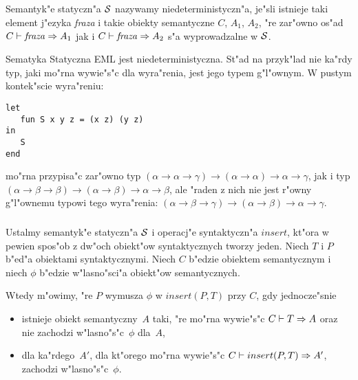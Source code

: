 \subsection{\secinterest}
\label{sec:interest}

\subsubsection{\secindeterm}
\label{sec:indeterm}

Semantyk"e statyczn"a $\mbox{$\cal S$}$ nazywamy niedeterministyczn"a, 
je"sli istnieje taki element j"ezyka {\it fraza} i takie obiekty semantyczne $C$, $A_1$, $A_2$,
"re zar"owno os"ad $C\vdash{\it fraza}\Rightarrow A_1$ jak i $C\vdash{\it fraza}\Rightarrow A_2$
s"a wyprowadzalne w $\mbox{$\cal S$}$.

Sematyka Statyczna EML jest niedeterministyczna.
St"ad na przyk"lad nie ka"rdy typ, jaki mo"rna wywie"s"c dla wyra"renia, jest jego typem g"l"ownym.
W pustym kontek"scie wyra"reniu:
\begin{verbatim}
let
   fun S x y z = (x z) (y z)
in
   S
end 
\end{verbatim}     
mo"rna przypisa"c zar"owno typ 
$(\alpha\rightarrow\alpha\rightarrow\gamma)\rightarrow 
(\alpha\rightarrow\alpha)\rightarrow\alpha\rightarrow\gamma$, 
jak i typ 
$(\alpha\rightarrow\beta\rightarrow\beta)\rightarrow
(\alpha\rightarrow\beta)\rightarrow\alpha\rightarrow\beta$,    
ale "raden z nich nie jest r"owny g"l"ownemu typowi tego wyra"renia:
$(\alpha\rightarrow\beta\rightarrow\gamma)\rightarrow
(\alpha\rightarrow\beta)\rightarrow\alpha\rightarrow\gamma$.

\subsubsection{\secimposing}
\label{sec:imposing}

Ustalmy semantyk"e statyczn"a $\mbox{$\cal S$}$ i operacj"e syntaktyczn"a $insert$,
kt"ora w pewien spos"ob z dw"och obiekt"ow syntaktycznych tworzy jeden.
Niech $T$ i $P$ b"ed"a obiektami syntaktycznymi.
Niech $C$ b"edzie obiektem semantycznym 
i niech $\phi$ b"edzie w"lasno"sci"a obiekt"ow semantycznych.

Wtedy m"owimy, "re $P$ wymusza $\phi$ w $insert(P, T)$ przy $C$, gdy jednocze"snie
\begin{itemize}
\item istnieje obiekt semantyczny~$A$ taki, "re mo"rna wywie"s"c 
      $C\vdash T \Rightarrow A$ oraz nie zachodzi w"lasno"s"c~$\phi$ dla~$A$,
\item dla ka"rdego~$A'$, dla kt"orego mo"rna wywie"s"c 
      $C\vdash insert(P, T) \Rightarrow A'$, zachodzi w"lasno"s"c~$\phi$.
\end{itemize}

